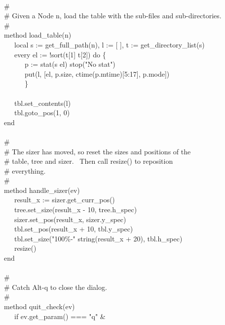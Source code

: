 {\ \\
\>   \# \\
\>   \# Given a Node n, load the table with the sub-files and sub-directories.\\
\>   \# \\
\>   method load\_table(n) \\
\>   \ \ \ local s := get\_full\_path(n), l := [ ], t := get\_directory\_list(s) \\
\>   \ \ \ every el := !sort(t[1] {\textbar}{\textbar}{\textbar} t[2])
do \{ \\
\>   \ \ \ \ \ \ p := stat(s {\textbar}{\textbar} el) {\textbar}
stop("No stat") \\
\>   \ \ \ \ \ \ put(l, [el, p.size, ctime(p.mtime)[5:17], p.mode]) \\
\>   \ \ \ \ \ \ \} \\
\ \\
\>   \ \ \ tbl.set\_contents(l) \\
\>   \ \ \ tbl.goto\_pos(1, 0) \\
\>   end \\
\ \\
\>   \# \\
\>   \# The sizer has moved, so reset the sizes and positions of the \\
\>   \# table, tree and sizer. \ Then call resize() to reposition \\
\>   \# everything. \\
\>   \# \\
\>   method handle\_sizer(ev) \\
\>   \ \ \ result\_x := sizer.get\_curr\_pos() \\
\>   \ \ \ tree.set\_size(result\_x - 10, tree.h\_spec) \\
\>   \ \ \ sizer.set\_pos(result\_x, sizer.y\_spec) \\
\>   \ \ \ tbl.set\_pos(result\_x + 10, tbl.y\_spec) \\
\>   \ \ \ tbl.set\_size("100\%-" {\textbar}{\textbar} string(result\_x + 20), tbl.h\_spec) \\
\>   \ \ \ resize() \\
\>   end \\
\ \\
\>   \# \\
\>   \# Catch Alt-q to close the dialog. \\
\>   \# \\
\>   method quit\_check(ev) \\
\>   \ \ \ if ev.get\_param() === "q" \&
}
